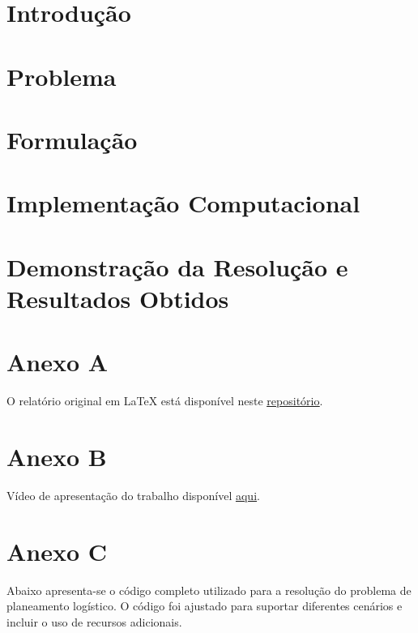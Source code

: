 \documentclass[12pt,a4paper,final]{article}
\begin{document}
    \section{Introdução}\label{sec:introducao}
    


    \section{Problema}\label{sec:problema}
    


    \section{Formulação}\label{sec:formulacao}
    


    \section{Implementação Computacional}\label{sec:implementacao-computacional}
    


    \section{Demonstração da Resolução e Resultados Obtidos}\label{sec:demonstracao-da-resolucao-e-resultados-obtidos}
    
    \newpage
    \appendix
    \section*{Anexo A}
    O relatório original em LaTeX está disponível neste \underline{\href{https://github.com/2100562/RelatorioIO}{repositório}}.

    \section*{Anexo B}
    Vídeo de apresentação do trabalho disponível \underline{\href{https://uabpt-my.sharepoint.com/:v:/g/personal/2100562_estudante_uab_pt/Eftz7VNy2aRGvoZk7G__rzEBpxJSsLZQq_2CU1UrSz5xWA?e=2g3iH6&isSPOFile=1}{aqui}}.

    \section*{Anexo C}

    Abaixo apresenta-se o código completo utilizado para a resolução do problema de planeamento logístico.
    O código foi ajustado para suportar diferentes cenários e incluir o uso de recursos adicionais.
\end{document}
